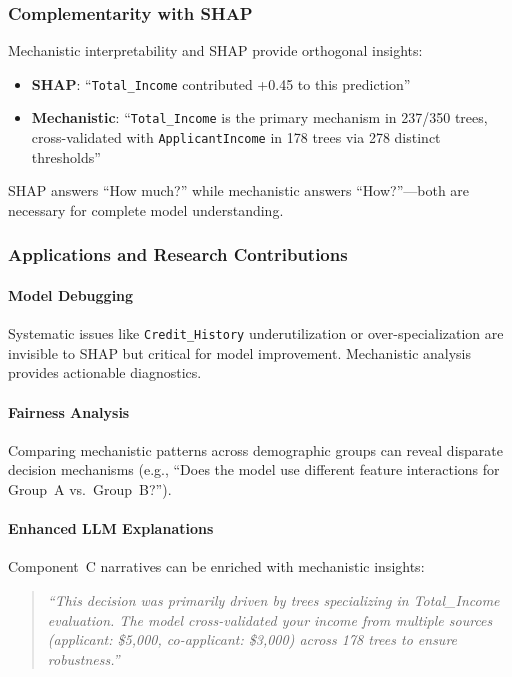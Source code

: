 \subsubsection{Complementarity with SHAP}

Mechanistic interpretability and SHAP provide orthogonal insights:
\begin{itemize}
    \item \textbf{SHAP}: ``\texttt{Total\_Income} contributed +0.45 to this prediction''
    \item \textbf{Mechanistic}: ``\texttt{Total\_Income} is the primary mechanism in 237/350 trees, cross-validated with \texttt{ApplicantIncome} in 178 trees via 278 distinct thresholds''
\end{itemize}
SHAP answers ``How much?'' while mechanistic answers ``How?''---both are necessary for complete model understanding.

\subsubsection{Applications and Research Contributions}

\paragraph{Model Debugging}
Systematic issues like \texttt{Credit\_History} underutilization or over-specialization are invisible to SHAP but critical for model improvement. Mechanistic analysis provides actionable diagnostics.

\paragraph{Fairness Analysis}
Comparing mechanistic patterns across demographic groups can reveal disparate decision mechanisms (e.g., ``Does the model use different feature interactions for Group~A vs.\ Group~B?'').

\paragraph{Enhanced LLM Explanations}
Component~C narratives can be enriched with mechanistic insights:
\begin{quote}
\emph{``This decision was primarily driven by trees specializing in Total\_Income evaluation. The model cross-validated your income from multiple sources (applicant: \$5,000, co-applicant: \$3,000) across 178 trees to ensure robustness.''}
\end{quote}

